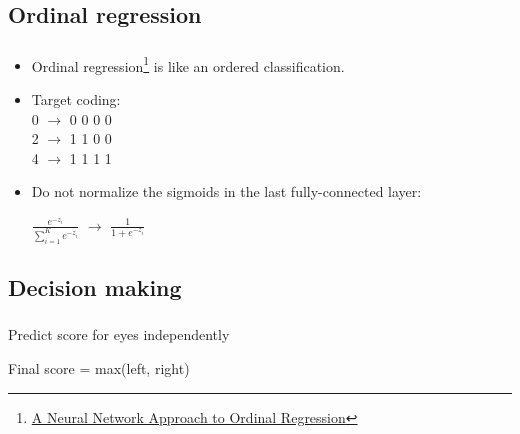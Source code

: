 \subsection{Ordinal regression}

\begin{frame}\frametitle{}
\begin{itemize}

\item Ordinal regression\footnote{\href{https://web.missouri.edu/~zwyw6/files/rank.pdf}{A Neural Network Approach to Ordinal Regression}} is like an ordered classification.
\item Target coding: \\\vspace{0.25cm}
0 $\rightarrow$  0 0 0 0\\
2 $\rightarrow$  1 1 0 0\\
4 $\rightarrow$  1 1 1 1\\
\item Do not normalize the sigmoids in the last fully-connected layer:\\\vspace{0.5cm}
\begin{center}
\begin{Large}
$\frac{e^{-z_i}}{\sum\limits_{i=1}^Ke^{-z_i}}$ $\rightarrow$ $\frac{1}{1 + e^{-z_i}}$
\end{Large}
\end{center}
\end{itemize}
\end{frame}


\subsection{Decision making}

\begin{frame}\frametitle{}
\par Predict score for eyes independently
\par Final score = max(left, right)
\end{frame}


